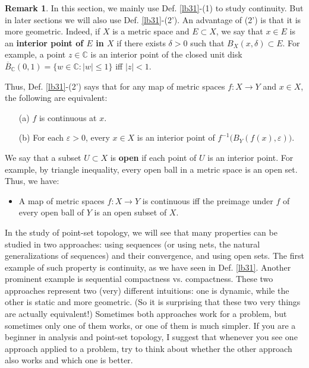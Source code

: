 \documentclass[12pt,b5paper,notitlepage]{article}
\theoremstyle{definition}
\newtheorem{rem}[df]{Remark}
\theoremstyle{plain}
\newcommand{\ovl}{\overline}
\newcommand{\Cbb}{\mathbb C}
\newcommand{\eps}{\varepsilon}
\numberwithin{equation}{section}
\begin{document}
\begin{rem}\label{lb115}
In this section, we mainly use Def. \ref{lb31}-(1) to study continuity. But in later sections we will also use Def. \ref{lb31}-(2'). An advantage of (2') is that it is more geometric. Indeed, if $X$ is a metric space and $E\subset X$, we say that $x\in E$ is an \textbf{interior point of $E$ in $X$}  if there exists $\delta>0$ such that $B_X(x,\delta)\subset E$. For example, a point  $z\in\Cbb$ is an interior point of the closed unit disk $\ovl B_\Cbb(0,1)=\{w\in\Cbb:|w|\leq 1\}$ iff $|z|<1$. 

Thus, Def. \ref{lb31}-(2') says that for any map of metric spaces $f:X\rightarrow Y$ and $x\in X$, the following are equivalent:
\begin{itemize}
\item[(a)] $f$ is continuous at $x$.
\item[(b)] For each $\eps>0$, every $x\in X$ is an interior point of $f^{-1}\big(B_Y(f(x),\varepsilon)\big)$.
\end{itemize}
We say that a subset $U\subset X$ is \textbf{open}  if each point of $U$ is an interior point. For example, by triangle inequality, every open ball in a metric space is an open set. Thus, we have:
\begin{itemize}
\item A map of metric spaces $f:X\rightarrow Y$ is continuous iff the preimage under $f$ of every open ball of $Y$ is an open subset of $X$.
\end{itemize}

In the study of point-set topology, we will see that many properties can be studied in two approaches: using sequences (or using nets, the natural generalizations of sequences) and their convergence, and using open sets. The first example of such property is continuity, as we have seen in Def. \ref{lb31}. Another prominent example is sequential compactness vs. compactness. These two approaches represent two (very) different intuitions: one is dynamic, while the other is static and more geometric. (So it is surprising that these two very things are actually equivalent!) Sometimes both approaches work for a problem, but sometimes only one of them works, or one of them is much simpler. If you are a beginner in analysis and point-set topology, I suggest that whenever you see one approach applied to a problem, try to think about whether the other approach also works and which one is better.   \hfill\qedsymbol
\end{rem}
\end{document}
